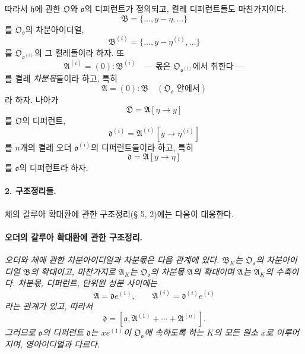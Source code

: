 따라서 \(\mathfrak h\)에 관한 \(\mathfrak O\)와 \(\mathfrak o\)의 디퍼런트가 정의되고, 켤레 디퍼런트들도 마찬가지이다. 
\[
\mathfrak B=\{\ldots,y-\eta,\ldots\}
\]
를 \(\mathfrak O_{\mathfrak o}\)의 차분아이디얼,
\[
\mathfrak B^{(i)}=\{\ldots,y-\eta^{(i)},\ldots\}
\]
를 \(\mathfrak O_{\mathfrak o^{(i)}}\)의 그 켤레들이라 하자. 또
\[
\mathfrak A^{(i)}=(0):\mathfrak B^{(i)}
\quad\text{--- 몫은 \(\mathfrak O_{\mathfrak o^{(i)}}\)에서 취한다 ---}
\]
를 켤레 \emph{차분몫}들이라 하고, 특히
\[
\mathfrak A=(0):\mathfrak B\quad(\mathfrak O_{\mathfrak o}\text{ 안에서})
\]
라 하자. 나아가
\[
\mathfrak D=\mathfrak A[\eta\to y]
\]
를 \(\mathfrak O\)의 디퍼런트,
\[
\mathfrak d^{(i)}=\mathfrak A^{(i)}[y\to\eta^{(i)}]
\]
를 \(n\)개의 켤레 오더 \(\mathfrak o^{(i)}\)의 디퍼런트들이라 하고, 특히
\[
\mathfrak d=\mathfrak A[y\to\eta]
\]
를 \(\mathfrak o\)의 디퍼런트라 하자.

\paragraph{2. 구조정리들.}
체의 갈루아 확대환에 관한 구조정리(§ 5, 2)에는 다음이 대응한다.

\paragraph{오더의 갈루아 확대환에 관한 구조정리.}
\emph{오더와 체에 관한 차분아이디얼과 차분몫은 다음 관계에 있다. \(\mathfrak B_K\)는 \(\mathfrak O_{\mathfrak o}\)의 차분아이디얼 \(\mathfrak B\)의 확대이고, 마찬가지로 \(\mathfrak A_K\)는 \(\mathfrak O_{\mathfrak o}\)의 차분몫 \(\mathfrak A\)의 확대이며 \(\mathfrak A\)는 \(\mathfrak A_K\)의 수축이다. 차분몫, 디퍼런트, 단위원 성분 사이에는}
\[
\mathfrak A=\mathfrak d e^{(1)},
\qquad
\mathfrak A^{(i)}=\mathfrak d^{(i)}e^{(i)}
\]
\emph{라는 관계가 있고, 따라서}
\[
\mathfrak d=[\mathfrak o,\mathfrak A^{(1)}+\cdots+\mathfrak A^{(n)}].
\]
\emph{그러므로 \(\mathfrak o\)의 디퍼런트 \(\mathfrak d\)는 \(xe^{(1)}\)이 \(\mathfrak O_{\mathfrak o}\)에 속하도록 하는 \(K\)의 모든 원소 \(x\)로 이루어지며, 영아이디얼과 다르다.}

